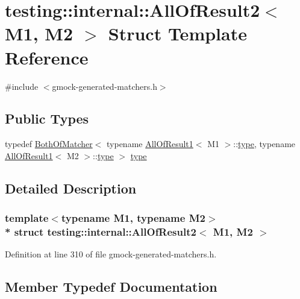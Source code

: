 \hypertarget{structtesting_1_1internal_1_1_all_of_result2}{}\section{testing\+:\+:internal\+:\+:All\+Of\+Result2$<$ M1, M2 $>$ Struct Template Reference}
\label{structtesting_1_1internal_1_1_all_of_result2}


{\ttfamily \#include $<$gmock-\/generated-\/matchers.\+h$>$}

\subsection*{Public Types}
\begin{DoxyCompactItemize}
\item 
typedef \hyperlink{classtesting_1_1internal_1_1_both_of_matcher}{Both\+Of\+Matcher}$<$ typename \hyperlink{structtesting_1_1internal_1_1_all_of_result1}{All\+Of\+Result1}$<$ M1 $>$\+::\hyperlink{structtesting_1_1internal_1_1_all_of_result2_adec0b0ce2fdd07d398e1fdd2cdb88392}{type}, typename \hyperlink{structtesting_1_1internal_1_1_all_of_result1}{All\+Of\+Result1}$<$ M2 $>$\+::\hyperlink{structtesting_1_1internal_1_1_all_of_result2_adec0b0ce2fdd07d398e1fdd2cdb88392}{type} $>$ \hyperlink{structtesting_1_1internal_1_1_all_of_result2_adec0b0ce2fdd07d398e1fdd2cdb88392}{type}
\end{DoxyCompactItemize}


\subsection{Detailed Description}
\subsubsection*{template$<$typename M1, typename M2$>$\\*
struct testing\+::internal\+::\+All\+Of\+Result2$<$ M1, M2 $>$}



Definition at line 310 of file gmock-\/generated-\/matchers.\+h.



\subsection{Member Typedef Documentation}
